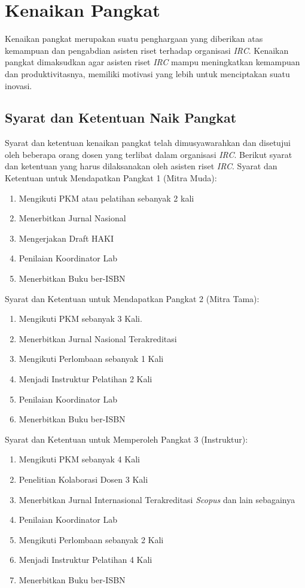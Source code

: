 \chapter{Kenaikan Pangkat}
Kenaikan pangkat merupakan suatu penghargaan yang diberikan atas kemampuan dan pengabdian asisten riset terhadap organisasi \textit{IRC}. Kenaikan pangkat dimaksudkan agar asisten riset \textit{IRC} mampu meningkatkan kemampuan dan produktivitasnya, memiliki motivasi yang lebih untuk menciptakan suatu inovasi.

\section{Syarat dan Ketentuan Naik Pangkat}
Syarat dan ketentuan kenaikan pangkat telah dimusyawarahkan dan disetujui oleh beberapa orang dosen yang terlibat dalam organisasi \textit{IRC}. Berikut syarat dan ketentuan yang harus dilaksanakan oleh asisten riset \textit{IRC}.
Syarat dan Ketentuan untuk Mendapatkan Pangkat 1 (Mitra Muda):
\begin{enumerate}
 \item Mengikuti PKM atau pelatihan sebanyak 2 kali
 \item Menerbitkan Jurnal Nasional
 \item Mengerjakan Draft HAKI
 \item Penilaian Koordinator Lab
 \item Menerbitkan Buku ber-ISBN
\end{enumerate}
Syarat dan Ketentuan untuk Mendapatkan Pangkat 2 (Mitra Tama):
\begin{enumerate}
 \item Mengikuti PKM sebanyak 3 Kali.
 \item Menerbitkan Jurnal Nasional Terakreditasi
 \item Mengikuti Perlombaan sebanyak 1 Kali
 \item Menjadi Instruktur Pelatihan 2 Kali
 \item Penilaian Koordinator Lab
 \item Menerbitkan Buku ber-ISBN
\end{enumerate}
Syarat dan Ketentuan untuk Memperoleh Pangkat 3 (Instruktur):
\begin{enumerate}
 \item Mengikuti PKM sebanyak 4 Kali
 \item Penelitian Kolaborasi Dosen 3 Kali
 \item Menerbitkan Jurnal Internasional Terakreditasi \textit{Scopus} dan lain sebagainya
 \item Penilaian Koordinator Lab
 \item Mengikuti Perlombaan sebanyak 2 Kali
 \item Menjadi Instruktur Pelatihan 4 Kali
 \item Menerbitkan Buku ber-ISBN
\end{enumerate}

